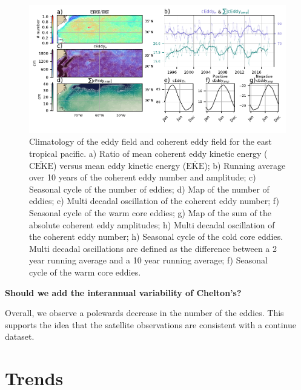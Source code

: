 \documentclass[draft,linenumbers]{agujournal2019}
\newcommand{\MEKE}{\overline{\textrm{EKE}}}
\newcommand{\MCEKE}{\overline{\textrm{CEKE}}}
\begin{document}
	\begin{figure}
	    \centering
	    \includegraphics[width=1\textwidth]{figures/regional_ratios_and_stats_V3_5.pdf}
	    \caption{Climatology of the eddy field and coherent eddy field for the east tropical pacific. a) Ratio of mean coherent eddy kinetic energy ($\MCEKE$) versus mean eddy kinetic energy ($\MEKE$); b) Running average over 10 years of the coherent eddy number and amplitude; c) Seasonal cycle of the number of eddies; d) Map of the number of eddies; 
		e) Multi decadal oscillation of the coherent eddy number; f) Seasonal cycle of the warm core eddies; g) Map of the sum of the absolute coherent eddy amplitudes;  h) Multi decadal oscillation of the coherent eddy number; h) Seasonal cycle of the cold core eddies. Multi decadal oscillations are defined as the difference between a 2 year running average and a 10 year running average; f) Seasonal cycle of the warm core eddies.}
	    \label{fig:south_atlantic_cycle}
	\end{figure}

	\textbf{Should we add the interannual variability of Chelton's?}

	Overall, we observe a polewards decrease in the number of the eddies. This supports the idea that the satellite observations are consistent with a continue dataset.




	\section{Trends}
\end{document}
